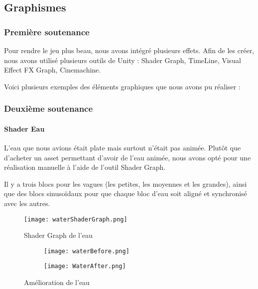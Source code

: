 \subsection{Graphismes}

    \subsubsection{Première soutenance}

        Pour rendre le jeu plus beau, nous avons intégré plusieurs effets.
        Afin de les créer, nous avons utilisé plusieurs outils de Unity :
        Shader Graph, TimeLine, Visual Effect FX Graph, Cinemachine.

        Voici plusieurs exemples des éléments graphiques que nous avons pu réaliser : 

    \subsubsection{Deuxième soutenance}

        \paragraph{Shader Eau}

        L'eau que nous avions était plate mais surtout n'était pas animée.
        Plutôt que d'acheter un asset permettant d'avoir de l'eau animée,
        nous avons opté pour une réalisation manuelle à l'aide de l'outil Shader Graph.

        Il y a trois blocs pour les vagues (les petites, les moyennes et les grandes),
        ainsi que des blocs sinusoïdaux pour que chaque bloc d'eau soit aligné et synchronisé avec les autres.
        \begin{figure}[hbt!]
            \centering
            \texttt{[image: waterShaderGraph.png]}
            \caption{Shader Graph de l'eau}
        \end{figure}
        
        
        \begin{figure}[hbt!]
            \begin{subfigure}[b]{0.49\textwidth}
                \texttt{[image: waterBefore.png]}
            \end{subfigure}
            \begin{subfigure}[b]{0.49\textwidth}
                \texttt{[image: WaterAfter.png]}
            \end{subfigure}
            \caption{Amélioration de l'eau}
        \end{figure}
        \FloatBarrier



